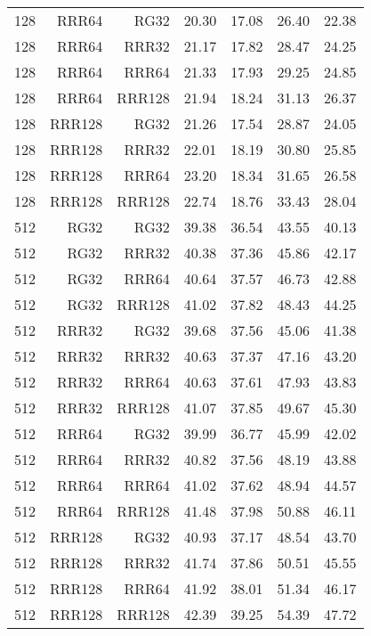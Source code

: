 \begin{table}
\begin{tabular}{|r|r|r|r|r|r|r|}
128 & RRR64 & RG32 & 20.30 & 17.08 & 26.40 & 22.38 \\
128 & RRR64 & RRR32 & 21.17 & 17.82 & 28.47 & 24.25 \\
128 & RRR64 & RRR64 & 21.33 & 17.93 & 29.25 & 24.85 \\
128 & RRR64 & RRR128 & 21.94 & 18.24 & 31.13 & 26.37 \\
128 & RRR128 & RG32 & 21.26 & 17.54 & 28.87 & 24.05 \\
128 & RRR128 & RRR32 & 22.01 & 18.19 & 30.80 & 25.85 \\
128 & RRR128 & RRR64 & 23.20 & 18.34 & 31.65 & 26.58 \\
128 & RRR128 & RRR128 & 22.74 & 18.76 & 33.43 & 28.04 \\
512 & RG32 & RG32 & 39.38 & 36.54 & 43.55 & 40.13 \\
512 & RG32 & RRR32 & 40.38 & 37.36 & 45.86 & 42.17 \\
512 & RG32 & RRR64 & 40.64 & 37.57 & 46.73 & 42.88 \\
512 & RG32 & RRR128 & 41.02 & 37.82 & 48.43 & 44.25 \\
512 & RRR32 & RG32 & 39.68 & 37.56 & 45.06 & 41.38 \\
512 & RRR32 & RRR32 & 40.63 & 37.37 & 47.16 & 43.20 \\
512 & RRR32 & RRR64 & 40.63 & 37.61 & 47.93 & 43.83 \\
512 & RRR32 & RRR128 & 41.07 & 37.85 & 49.67 & 45.30 \\
512 & RRR64 & RG32 & 39.99 & 36.77 & 45.99 & 42.02 \\
512 & RRR64 & RRR32 & 40.82 & 37.56 & 48.19 & 43.88 \\
512 & RRR64 & RRR64 & 41.02 & 37.62 & 48.94 & 44.57 \\
512 & RRR64 & RRR128 & 41.48 & 37.98 & 50.88 & 46.11 \\
512 & RRR128 & RG32 & 40.93 & 37.17 & 48.54 & 43.70 \\
512 & RRR128 & RRR32 & 41.74 & 37.86 & 50.51 & 45.55 \\
512 & RRR128 & RRR64 & 41.92 & 38.01 & 51.34 & 46.17 \\
512 & RRR128 & RRR128 & 42.39 & 39.25 & 54.39 & 47.72 \\
\hline
\end{tabular}
\end{table}

